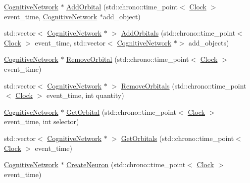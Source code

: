 \begin{DoxyCompactItemize}
\mbox{\hyperlink{class_cognitive_network}{Cognitive\+Network}} $\ast$ \mbox{\hyperlink{class_cognitive_network_ab6caa285c25568259ae935cf9e746af4}{Add\+Orbital}} (std\+::chrono\+::time\+\_\+point$<$ \mbox{\hyperlink{universe_8h_a0ef8d951d1ca5ab3cfaf7ab4c7a6fd80}{Clock}} $>$ event\+\_\+time, \mbox{\hyperlink{class_cognitive_network}{Cognitive\+Network}} $\ast$add\+\_\+object)
\item 
std\+::vector$<$ \mbox{\hyperlink{class_cognitive_network}{Cognitive\+Network}} $\ast$ $>$ \mbox{\hyperlink{class_cognitive_network_a9dbf4a9fab3b806d2bd6b2701b7a9548}{Add\+Orbitals}} (std\+::chrono\+::time\+\_\+point$<$ \mbox{\hyperlink{universe_8h_a0ef8d951d1ca5ab3cfaf7ab4c7a6fd80}{Clock}} $>$ event\+\_\+time, std\+::vector$<$ \mbox{\hyperlink{class_cognitive_network}{Cognitive\+Network}} $\ast$$>$ add\+\_\+objects)
\item 
\mbox{\hyperlink{class_cognitive_network}{Cognitive\+Network}} $\ast$ \mbox{\hyperlink{class_cognitive_network_a6ed0e198f6dcfdd45d57df5d3ad5754c}{Remove\+Orbital}} (std\+::chrono\+::time\+\_\+point$<$ \mbox{\hyperlink{universe_8h_a0ef8d951d1ca5ab3cfaf7ab4c7a6fd80}{Clock}} $>$ event\+\_\+time)
\item 
std\+::vector$<$ \mbox{\hyperlink{class_cognitive_network}{Cognitive\+Network}} $\ast$ $>$ \mbox{\hyperlink{class_cognitive_network_af7834d400995607c2a5a5eac7b5e006d}{Remove\+Orbitals}} (std\+::chrono\+::time\+\_\+point$<$ \mbox{\hyperlink{universe_8h_a0ef8d951d1ca5ab3cfaf7ab4c7a6fd80}{Clock}} $>$ event\+\_\+time, int quantity)
\item 
\mbox{\hyperlink{class_cognitive_network}{Cognitive\+Network}} $\ast$ \mbox{\hyperlink{class_cognitive_network_a69655ef1e12bac5f74c2eb85c72720f4}{Get\+Orbital}} (std\+::chrono\+::time\+\_\+point$<$ \mbox{\hyperlink{universe_8h_a0ef8d951d1ca5ab3cfaf7ab4c7a6fd80}{Clock}} $>$ event\+\_\+time, int selector)
\item 
std\+::vector$<$ \mbox{\hyperlink{class_cognitive_network}{Cognitive\+Network}} $\ast$ $>$ \mbox{\hyperlink{class_cognitive_network_aa21d28ffc3b507236a7dad64663f6c42}{Get\+Orbitals}} (std\+::chrono\+::time\+\_\+point$<$ \mbox{\hyperlink{universe_8h_a0ef8d951d1ca5ab3cfaf7ab4c7a6fd80}{Clock}} $>$ event\+\_\+time)
\item 
\mbox{\hyperlink{class_cognitive_network}{Cognitive\+Network}} $\ast$ \mbox{\hyperlink{class_cognitive_network_a9b5fcaf824d5b587775e7c44630affe6}{Create\+Neuron}} (std\+::chrono\+::time\+\_\+point$<$ \mbox{\hyperlink{universe_8h_a0ef8d951d1ca5ab3cfaf7ab4c7a6fd80}{Clock}} $>$ event\+\_\+time)
$$
\end{DoxyCompactItemize}

